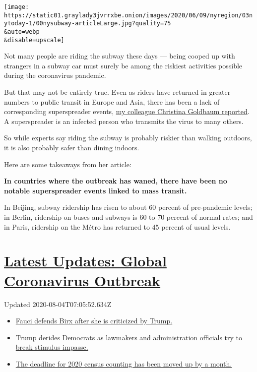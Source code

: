 \texttt{[image: https://static01.graylady3jvrrxbe.onion/images/2020/06/09/nyregion/03nytoday-1/00nysubway-articleLarge.jpg?quality=75\\\&auto=webp\\\&disable=upscale]}

Not many people are riding the subway these days --- being cooped up
with strangers in a subway car must surely be among the riskiest
activities possible during the coronavirus pandemic.

But that may not be entirely true. Even as riders have returned in
greater numbers to public transit in Europe and Asia, there has been a
lack of corresponding superspreader events,
\href{https://www.nytimes3xbfgragh.onion/2020/08/02/nyregion/nyc-subway-coronavirus-safety.html}{my
colleague Christina Goldbaum reported}. A superspreader is an infected
person who transmits the virus to many others.

So while experts say riding the subway is probably riskier than walking
outdoors, it is also probably safer than dining indoors.

Here are some takeaways from her article:

\textbf{In countries where the outbreak has waned, there have been no
notable superspreader events linked to mass transit.}

In Beijing, subway ridership has risen to about 60 percent of
pre-pandemic levels; in Berlin, ridership on buses and subways is 60 to
70 percent of normal rates; and in Paris, ridership on the Métro has
returned to 45 percent of usual levels.

\hypertarget{latest-updates-global-coronavirus-outbreak}{%
\section{\texorpdfstring{\href{https://www.nytimes3xbfgragh.onion/2020/08/03/world/coronavirus-covid-19.html?action=click\&pgtype=Article\&state=default\&region=MAIN_CONTENT_1\&context=storylines_live_updates}{Latest
Updates: Global Coronavirus
Outbreak}}{Latest Updates: Global Coronavirus Outbreak}}\label{latest-updates-global-coronavirus-outbreak}}

Updated 2020-08-04T07:05:52.634Z

\begin{itemize}
\tightlist
\item
  \href{https://www.nytimes3xbfgragh.onion/2020/08/03/world/coronavirus-covid-19.html?action=click\&pgtype=Article\&state=default\&region=MAIN_CONTENT_1\&context=storylines_live_updates\#link-4547638f}{Fauci
  defends Birx after she is criticized by Trump.}
\item
  \href{https://www.nytimes3xbfgragh.onion/2020/08/03/world/coronavirus-covid-19.html?action=click\&pgtype=Article\&state=default\&region=MAIN_CONTENT_1\&context=storylines_live_updates\#link-15e7f995}{Trump
  derides Democrats as lawmakers and administration officials try to
  break stimulus impasse.}
\item
  \href{https://www.nytimes3xbfgragh.onion/2020/08/03/world/coronavirus-covid-19.html?action=click\&pgtype=Article\&state=default\&region=MAIN_CONTENT_1\&context=storylines_live_updates\#link-e5a2cda}{The
  deadline for 2020 census counting has been moved up by a month.}
\end{itemize}

